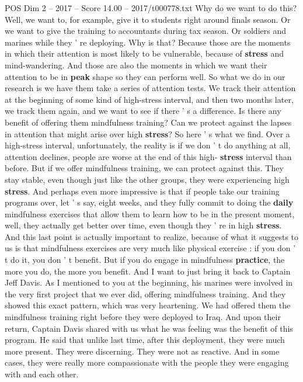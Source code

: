\begin{textsample}{POS Dim 2 – 2017 – Score 14.00 – 2017/t000778.txt}
Why do we want to do this?
Well, we want to, for example, give it to students right around finals season.
Or we want to give the training to accountants during tax season.
Or soldiers and marines while they ' re deploying.
Why is that?
Because those are the moments in which their attention is most likely to be vulnerable, because of \textbf{stress} and mind-wandering.
And those are also the moments in which we want their attention to be in \textbf{peak} shape so they can perform well.
So what we do in our research is we have them take a series of attention tests.
We track their attention at the beginning of some kind of high-stress interval, and then two months later, we track them again, and we want to see if there ' s a difference.
Is there any benefit of offering them mindfulness training?
Can we protect against the lapses in attention that might arise over high \textbf{stress}?
So here ' s what we find.
Over a high-stress interval, unfortunately, the reality is if we don ' t do anything at all, attention declines, people are worse at the end of this high- \textbf{stress} interval than before.
But if we offer mindfulness training, we can protect against this.
They stay stable, even though just like the other groups, they were experiencing high \textbf{stress}.
And perhaps even more impressive is that if people take our training programs over, let ' s say, eight weeks, and they fully commit to doing the \textbf{daily} mindfulness exercises that allow them to learn how to be in the present moment, well, they actually get better over time, even though they ' re in high \textbf{stress}.
And this last point is actually important to realize, because of what it suggests to us is that mindfulness exercises are very much like physical exercise : if you don ' t do it, you don ' t benefit.
But if you do engage in mindfulness \textbf{practice}, the more you do, the more you benefit.
And I want to just bring it back to Captain Jeff Davis.
As I mentioned to you at the beginning, his marines were involved in the very first project that we ever did, offering mindfulness training.
And they showed this exact pattern, which was very heartening.
We had offered them the mindfulness training right before they were deployed to Iraq.
And upon their return, Captain Davis shared with us what he was feeling was the benefit of this program.
He said that unlike last time, after this deployment, they were much more present.
They were discerning.
They were not as reactive.
And in some cases, they were really more compassionate with the people they were engaging with and each other.

\end{textsample}
